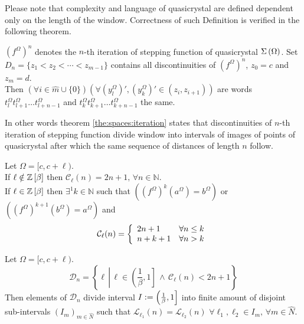\documentclass[text.tex]{subfiles}
\begin{document}
\begin{remark}
Please note that complexity and language of quasicrystal are defined dependent only on the length of the window. Correctness of such Definition is verified in the following theorem.
\end{remark}

\begin{theorem}
\label{the:spaces:iteration}
${(f^\Omega)}^n$ denotes the $n$-th iteration of stepping function of quasicrystal $\Sigma\left(\Omega\right)$. Set $D_n = \{z_1 < z_2 < \dotsb < z_{m-1}\}$ contains all discontinuities of ${(f^\Omega)}^n$, $z_0 = c$ and $z_m = d$.\\
Then $(\forall i \in \widehat{m}\cup\{0\})(\forall {\left(y_l^\Omega\right)}' ,{\left(y_k^\Omega\right)}' \in (z_i, z_{i+1}))$ are words $t_l^\Omega t_{l+1}^\Omega \dotso t_{l+n-1}^\Omega$ and $t_k^\Omega t_{k+1}^\Omega \dotso t_{k+n-1}^\Omega$ the same.
\end{theorem}

\begin{remark}
In other words theorem \ref{the:spaces:iteration} states that discontinuities of $n$-th iteration of stepping function divide window into intervals of images of points of quasicrystal after which the same sequence of distances of length $n$ follow.
\end{remark}

\begin{theorem}
\label{the:complexity}
Let $\Omega = [c,c+\ell)$.\\
If $\ell \notin \mathbb{Z}\left[\beta\right]$ then $\mathcal{C}_{\ell}(n) = 2n+1,\, \forall n\in\mathbb{N}$. \\
If $\ell \in \mathbb{Z}\left[\beta\right]$ then $\exists^1 k \in \mathbb{N}$ such that $\left({(f^\Omega)}^{k}(a^\Omega) = b^\Omega\right)$ or $\left({(f^\Omega)}^{k+1}(b^\Omega) = a^\Omega\right)$ and 
$$\mathcal{C}_{\ell}(n) = \left\{
	\begin{array}{l l}
		2n+1	&	\forall n\leq k \\
		n+k+1	&	\forall n > k
	\end{array}
	\right.
$$
\end{theorem}

\begin{theorem}
\label{the:sameSpaces}
Let $\Omega = [c,c+\ell)$.
$$\mathcal{D}_n = \left\{ \ell\,\left|\, \ell\in \left(\frac{1}{\beta},1\right] \,\wedge\, \mathcal{C}_\ell(n) < 2n+1 \right.\right\}$$
Then elements of $\mathcal{D}_n$ divide interval $I \vcentcolon= \left(\frac{1}{\beta},1\right]$ into finite amount of disjoint sub-intervals $(I_m)_{m\in\hat{N}}$ such that $\mathcal{L}_{\ell_1}(n) = \mathcal{L}_{\ell_2}(n)$ $\forall \ell_1, \ell_2 \in I_m,\, \forall m\in\hat{N}$.
\end{theorem}
\end{document}
